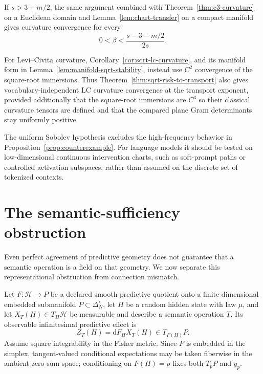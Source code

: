 \documentclass[11pt]{article}
\theoremstyle{definition}
\theoremstyle{remark}
\newcommand{\simplex}{\Delta_{N}^{\circ}}
\newcommand{\dd}{\mathrm{d}}
\begin{document}
If $s>3+m/2$, the same argument combined with
Theorem~\ref{thm:c3-curvature} on a Euclidean domain and
Lemma~\ref{lem:chart-transfer} on a compact manifold gives curvature convergence
for every
\begin{equation}
    0<\beta<\frac{s-3-m/2}{2s}.
\end{equation}

For Levi--Civita curvature, Corollary~\ref{cor:sqrt-lc-curvature}, and its
manifold form in Lemma~\ref{lem:manifold-sqrt-stability}, instead use $C^2$
convergence of the square-root immersions. Thus
Theorem~\ref{thm:sqrt-risk-to-transport} also gives vocabulary-independent LC
curvature convergence at the transport exponent, provided additionally that
the square-root immersions are $C^3$ so their classical curvature tensors are
defined and that the compared plane Gram determinants stay uniformly positive.

The uniform Sobolev hypothesis excludes the high-frequency behavior in Proposition~\ref{prop:counterexample}. For language models it should be tested on low-dimensional continuous intervention charts, such as soft-prompt paths or controlled activation subspaces, rather than assumed on the discrete set of tokenized contexts.

\section{The semantic-sufficiency obstruction}\label{sec:semantic-obstruction}

Even perfect agreement of predictive geometry does not guarantee that a semantic operation is a field on that geometry. We now separate this representational obstruction from connection mismatch.

Let $F:\mathcal H\to P$ be a declared smooth predictive quotient onto a
finite-dimensional embedded submanifold $P\subset\simplex$, let $H$ be a random
hidden state with law $\mu$, and let $X_T(H)\in T_H\mathcal H$ be measurable and
describe a semantic operation $T$. Its observable infinitesimal predictive
effect is
\begin{equation}
    Z_T(H)=\dd F_H X_T(H)\in T_{F(H)}P.
\end{equation}
Assume square integrability in the Fisher metric. Since $P$ is embedded in the simplex, tangent-valued conditional expectations may be taken fiberwise in the ambient zero-sum space; conditioning on $F(H)=p$ fixes both $T_pP$ and $g_p$.
\end{document}

